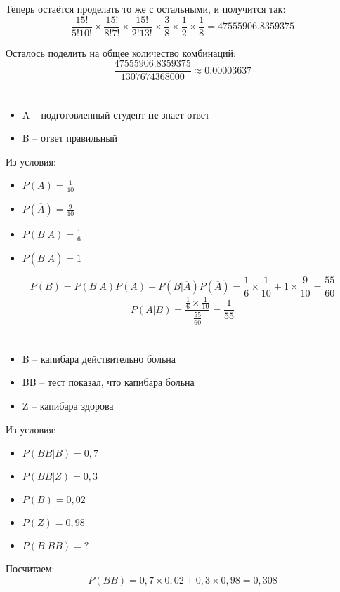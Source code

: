 \documentclass[a4paper,10pt]{article}
\begin{document}
Теперь остаётся проделать то же с остальными, и получится так:
$$
\frac{15!}{5!10!} \times \frac{15!}{8!7!} \times \frac{15!}{2!13!}
\times \frac{3}{8} \times \frac{1}{2} \times \frac{1}{8}
= 47555906.8359375
$$

Осталось поделить на общее количество комбинаций:
$$\frac{47555906.8359375}{1 307 674 368 000} \approx 0.00003637$$

\section{}
\begin{itemize}
 \item A -- подготовленный студент \textbf{не} знает ответ
 \item B -- ответ правильный
\end{itemize}
Из условия:
\begin{itemize}
 \item $P(A) = \frac{1}{10}$
 \item $P(\overline{A}) = \frac{9}{10}$
 \item $P(B|A) = \frac{1}{6}$
 \item $P(B|\overline{A}) = 1$
\end{itemize}

$$
P(B) = P(B|A)P(A) + P(B|\overline{A})P(\overline{A})
= \frac{1}{6} \times \frac{1}{10} + 1 \times \frac{9}{10}
= \frac{55}{60}
$$
$$ P(A|B) = \frac{\frac{1}{6} \times \frac{1}{10}}{\frac{55}{60}} = \frac{1}{55} $$

\section{}
\begin{itemize}
 \item B -- капибара действительно больна
 \item BB -- тест показал, что капибара больна
 \item Z -- капибара здорова
\end{itemize}
Из условия:
\begin{itemize}
 \item $P(BB|B) = 0,7$
 \item $P(BB|Z) = 0,3$
 \item $P(B) = 0,02$
 \item $P(Z) = 0,98$
 \item $P(B|BB) = ?$
\end{itemize}

Посчитаем:
$$ P(BB) = 0,7 \times 0,02 + 0,3 \times 0,98 = 0,308 $$
\end{document}
